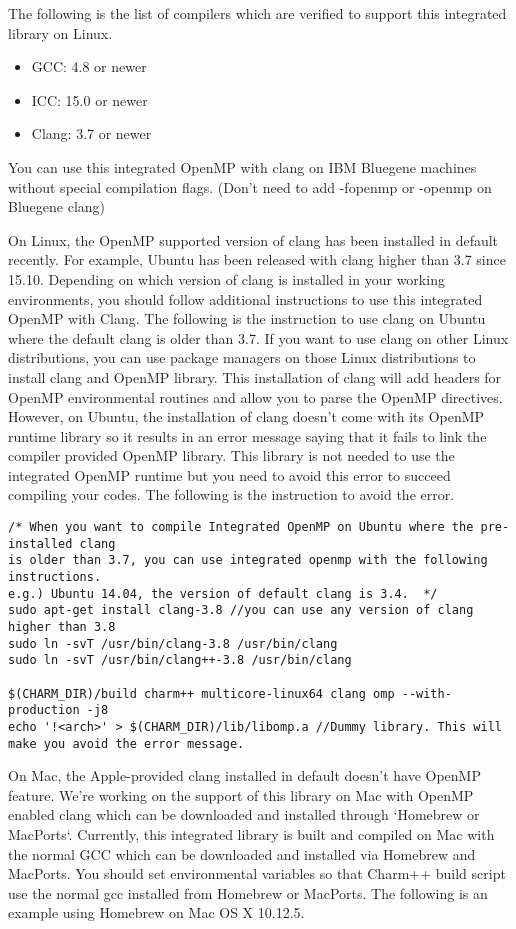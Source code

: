 The following is the list of compilers which are verified to support this integrated library on Linux.
\begin{itemize}
  \item GCC: 4.8 or newer
  \item ICC: 15.0 or newer
  \item Clang: 3.7 or newer
\end{itemize}

You can use this integrated OpenMP with clang on IBM Bluegene machines without special compilation flags.  
(Don't need to add -fopenmp or -openmp on Bluegene clang)

On Linux, the OpenMP supported version of clang has been installed in default recently. For example, 
Ubuntu has been released with clang higher than 3.7 since 15.10.
Depending on which version of clang is installed in your working environments, you should follow additional instructions
to use this integrated OpenMP with Clang. The following is the instruction to use 
clang on Ubuntu where the default clang is older than 3.7. If you want to use clang on other Linux 
distributions, you can use package managers on those Linux distributions to install clang and OpenMP library. 
This installation of clang will add headers for OpenMP environmental routines and allow you to parse the OpenMP directives.
However, on Ubuntu, the installation of clang doesn't come with its OpenMP runtime library so it results in an error message saying that
it fails to link the compiler provided OpenMP library. This library is not needed to use the integrated OpenMP runtime but you
need to avoid this error to succeed compiling your codes. The following is the instruction to avoid the error. 

\begin{verbatim}
/* When you want to compile Integrated OpenMP on Ubuntu where the pre-installed clang
is older than 3.7, you can use integrated openmp with the following instructions.
e.g.) Ubuntu 14.04, the version of default clang is 3.4.  */
sudo apt-get install clang-3.8 //you can use any version of clang higher than 3.8
sudo ln -svT /usr/bin/clang-3.8 /usr/bin/clang
sudo ln -svT /usr/bin/clang++-3.8 /usr/bin/clang

$(CHARM_DIR)/build charm++ multicore-linux64 clang omp --with-production -j8 
echo '!<arch>' > $(CHARM_DIR)/lib/libomp.a //Dummy library. This will make you avoid the error message.
\end{verbatim}

On Mac, the Apple-provided clang installed in default doesn't have OpenMP feature. We're working on the support of 
this library on Mac with OpenMP enabled clang which can be downloaded and installed through `Homebrew or MacPorts`.
Currently, this integrated library is built and compiled on Mac with the normal GCC which can be downloaded and 
installed via Homebrew and MacPorts. You should set environmental variables so that Charm++ build script use the
normal gcc installed from Homebrew or MacPorts. The following is an example using Homebrew on Mac OS X 10.12.5.

